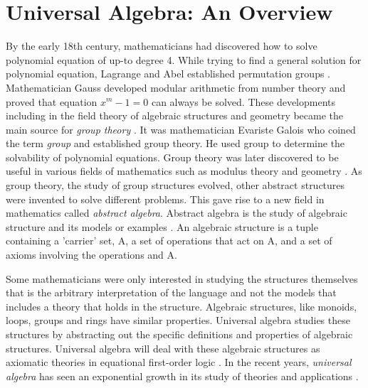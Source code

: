 \chapter{Universal Algebra: An Overview}
By the early 18th century, mathematicians had discovered how to solve polynomial
equation of up-to degree 4. While trying to find a general solution for
polynomial equation, Lagrange and Abel established permutation groups
\cite{barnett2017roots}. Mathematician Gauss developed modular arithmetic from
number theory and proved that equation $x^{m}-1=0$ can always be solved. These
developments including in the field theory of algebraic structures and geometry
became the main source for \textit{group theory} \cite{enwiki:1145792803}. It
was mathematician Evariste Galois who coined the term \emph{group} and
established group theory. He used group to determine the solvability of
polynomial equations. Group theory was later discovered to be useful in various
fields of mathematics such as modulus theory and geometry
\cite{enwiki:1107380309}. As group theory, the study of group structures
evolved, other abstract structures were invented to solve different problems.
This gave rise to a new field in mathematics called \emph{abstract algebra}.
Abstract algebra is the study of algebraic structure and its models or examples
\cite{enwiki:1107380309}. An algebraic structure is a tuple containing a
'carrier' set, A, a set of operations that act on A, and a set of axioms
involving the operations and A. 

Some mathematicians were only interested in studying the structures themselves
that is the arbitrary interpretation of the language and not the models that
includes a theory that holds in the structure. Algebraic structures, like
monoids, loops, groups and rings have similar properties. Universal algebra
studies these structures by abstracting out the specific definitions and
properties of algebraic structures. Universal algebra will deal with these
algebraic structures as axiomatic theories in equational first-order logic
\cite{YSharoda}. In the recent years, \emph{universal algebra} has seen an
exponential growth in its study of theories and applications
\cite{sankappanavar1981course}.

